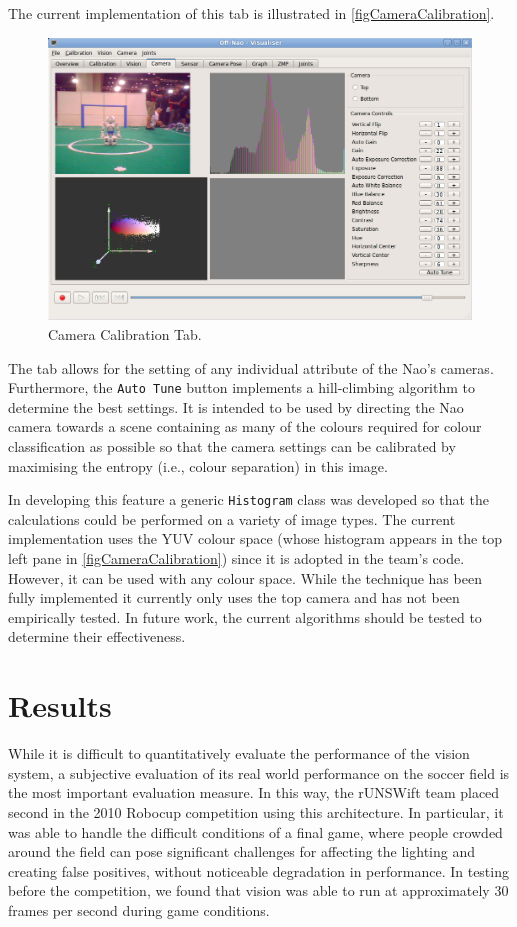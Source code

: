 \documentclass[pdftex,11pt,a4paper]{report}
\begin{document}
The current implementation of this tab is illustrated in \autoref{figCameraCalibration}.
\begin{figure} [ht]
\centering
\includegraphics[width=1.0\textwidth]{figures/CameraCalibration.png}
\caption{Camera Calibration Tab.} \label{figCameraCalibration}
\end{figure}
The tab allows for the setting of any individual attribute of the Nao's cameras.
Furthermore, the \texttt{Auto Tune} button implements a hill-climbing
algorithm to determine the best settings.
It is intended to be used by directing the Nao camera towards a scene containing as many
of the colours required for colour classification as possible so that the
camera settings can be calibrated by maximising the entropy (i.e., colour separation)
in this image.

In developing this feature a generic \texttt{Histogram} class was developed so that
the calculations could be performed on a variety of image types.
The current implementation uses the YUV colour space
(whose histogram appears in the top left pane in \autoref{figCameraCalibration})
since it is adopted in the team's code.
However, it can be used with any colour space.
While the technique has been fully implemented it currently only uses the top camera
and has not been empirically tested.
In future work, the current algorithms should be tested to determine their effectiveness.

\section{Results} \label{sectionVisionResults}

While it is difficult to quantitatively evaluate the performance of the vision system, a subjective evaluation of its real world performance on the soccer field is the most important evaluation measure. In this way, the rUNSWift team placed second in the 2010 Robocup competition using this architecture. In particular, it was able to handle the difficult conditions of a final game, where people crowded around the field can pose significant challenges for affecting the lighting and creating false positives, without noticeable degradation in performance. In testing before the competition, we found that vision was able to run at approximately 30 frames per second during game conditions.
\end{document}
